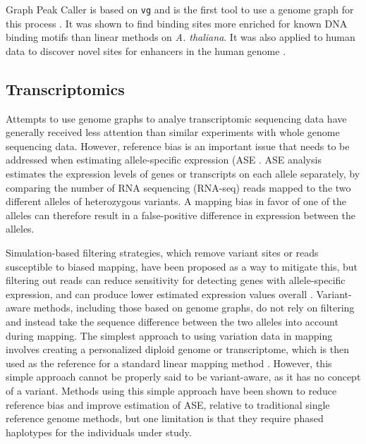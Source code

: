 Graph Peak Caller is based on \texttt{vg} and is the first tool to use a genome graph for this process \cite{Grytten_2019}.
It was shown to find binding sites more enriched for known DNA binding motifs than linear methods on \emph{A.
thaliana}.
It was also applied to human data to discover novel sites for enhancers in the human genome \cite{groza2019personalized}. 


\subsection{Transcriptomics}

Attempts to use genome graphs to analye transcriptomic sequencing data have generally received less attention than similar experiments with whole genome sequencing data.
However, reference bias is an important issue that needs to be addressed when estimating allele-specific expression (ASE \cite{Degner2009-vw,Castel2015-ef}.
ASE analysis estimates the expression levels of genes or transcripts on each allele separately, by comparing the number of RNA sequencing (RNA-seq) reads mapped to the two different alleles of heterozygous variants.
A mapping bias in favor of one of the alleles can therefore result in a false-positive difference in expression between the alleles.

Simulation-based filtering strategies, which remove variant sites or reads susceptible to biased mapping, have been proposed as a way to mitigate this, but filtering out reads can reduce sensitivity for detecting genes with allele-specific expression, and can produce lower estimated expression values overall \cite{Castel2015-ef,Van_de_Geijn2015-dz}. 
Variant-aware methods, including those based on genome graphs, do not rely on filtering and instead take the sequence difference between the two alleles into account during mapping.
The simplest approach to using variation data in mapping involves creating a personalized diploid genome or transcriptome, which is then used as the reference for a standard linear mapping method \cite{Turro2011-op,Rozowsky_2011,Bray_2016,Raghupathy2018-sd}.
However, this simple approach cannot be properly said to be variant-aware, as it has no concept of a variant.
Methods using this simple approach have been shown to reduce reference bias and improve estimation of ASE, relative to traditional single reference genome methods, but one limitation is that they require phased haplotypes for the individuals under study.

